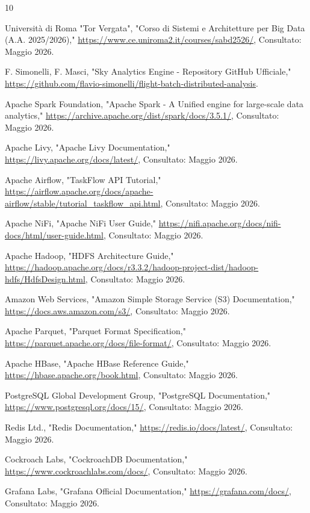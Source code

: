 \documentclass[conference]{IEEEtran}
\begin{document}
\begin{thebibliography}{10}


    Università di Roma "Tor Vergata", "Corso di Sistemi e Architetture per Big Data (A.A. 2025/2026)," \url{https://www.ce.uniroma2.it/courses/sabd2526/}, Consultato: Maggio 2026.

    F. Simonelli, F. Masci, "Sky Analytics Engine - Repository GitHub Ufficiale," \url{https://github.com/flavio-simonelli/flight-batch-distributed-analysis}.

    Apache Spark Foundation, "Apache Spark - A Unified engine for large-scale data analytics," \url{https://archive.apache.org/dist/spark/docs/3.5.1/}, Consultato: Maggio 2026.

    Apache Livy, "Apache Livy Documentation," \url{https://livy.apache.org/docs/latest/}, Consultato: Maggio 2026.

    Apache Airflow, "TaskFlow API Tutorial," \url{https://airflow.apache.org/docs/apache-airflow/stable/tutorial_taskflow_api.html}, Consultato: Maggio 2026.

    Apache NiFi, "Apache NiFi User Guide," \url{https://nifi.apache.org/docs/nifi-docs/html/user-guide.html}, Consultato: Maggio 2026.

    Apache Hadoop, "HDFS Architecture Guide," \url{https://hadoop.apache.org/docs/r3.3.2/hadoop-project-dist/hadoop-hdfs/HdfsDesign.html}, Consultato: Maggio 2026.

    Amazon Web Services, "Amazon Simple Storage Service (S3) Documentation," \url{https://docs.aws.amazon.com/s3/}, Consultato: Maggio 2026.

    Apache Parquet, "Parquet Format Specification," \url{https://parquet.apache.org/docs/file-format/}, Consultato: Maggio 2026.

    Apache HBase, "Apache HBase Reference Guide," \url{https://hbase.apache.org/book.html}, Consultato: Maggio 2026.

    PostgreSQL Global Development Group, "PostgreSQL Documentation," \url{https://www.postgresql.org/docs/15/}, Consultato: Maggio 2026.

    Redis Ltd., "Redis Documentation," \url{https://redis.io/docs/latest/}, Consultato: Maggio 2026.

    Cockroach Labs, "CockroachDB Documentation," \url{https://www.cockroachlabs.com/docs/}, Consultato: Maggio 2026.


    Grafana Labs, "Grafana Official Documentation," \url{https://grafana.com/docs/}, Consultato: Maggio 2026.

\end{thebibliography}
\end{document}
